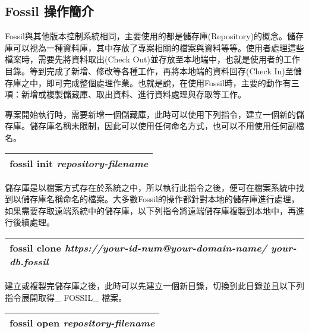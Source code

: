 \subsection{Fossil 操作簡介}
\par
\renewcommand{\baselinestretch}{1} %
\twelve \qquad Fossil與其他版本控制系統相同，主要使用的都是儲存庫(Repository)的概念。儲存庫可以視為一種資料庫，其中存放了專案相關的檔案與資料等等。使用者處理這些檔案時，需要先將資料取出(Check Out)並存放至本地端中，也就是使用者的工作目錄。等到完成了新增、修改等各種工作，再將本地端的資料回存(Check In)至儲存庫之中，即可完成整個處理作業。也就是說，在使用Fossil時，主要的動作有三項：新增或複製儲藏庫、取出資料、進行資料處理與存取等工作。
\\
\par
\renewcommand{\baselinestretch}{1} %
\twelve \hspace{0.5em} 專案開始執行時，需要新增一個儲藏庫，此時可以使用下列指令，建立一個新的儲存庫。儲存庫名稱未限制，因此可以使用任何命名方式，也可以不用使用任何副檔名。
\par
\begin{center}
\begin{tabular}{||p{15cm}|} %
\hline
\textbf{fossil init} \emph{repository-filename}
\\
\hline
\end{tabular}
\end{center}
\par
\renewcommand{\baselinestretch}{1} %
\twelve \hspace{0.5em} 儲存庫是以檔案方式存在於系統之中，所以執行此指令之後，便可在檔案系統中找到以儲存庫名稱命名的檔案。大多數Fossil的操作都針對本地的儲存庫進行處理，如果需要存取遠端系統中的儲存庫，以下列指令將遠端儲存庫複製到本地中，再進行後續處理。
\par
\begin{center}
\begin{tabular}{||p{15cm}|} %
\hline
\textbf{fossil clone} \emph{https://your-id-num@your-domain-name/ your-db.fossil}
\\
\hline
\end{tabular}
\end{center}
\par
\renewcommand{\baselinestretch}{1} %
\twelve \hspace{0.5em} 建立或複製完儲存庫之後，此時可以先建立一個新目錄，切換到此目錄並且以下列指令展開取得\_ FOSSIL\_ 檔案。
\par
\begin{center}
\begin{tabular}{||p{15cm}|} %
\hline
\textbf{fossil open} \emph{repository-filename}
\\
\hline
\end{tabular}
\end{center}
